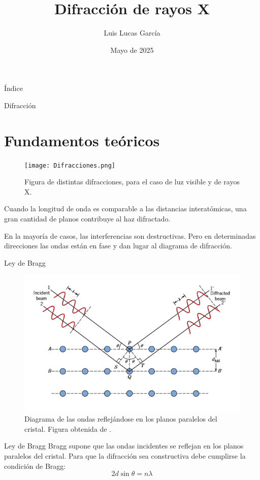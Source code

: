 \documentclass{beamer}
\title[Difracción de rayos X]{Difracción de rayos X}
\author{Luis Lucas García}
\institute[UA]{Universidad de Alicante - Facultad de Ciencias - Grado en física - Ciencia de Materiales}
\date{Mayo de 2025}
\begin{document}
\maketitle
\begin{frame}{Índice}
    \tableofcontents
\end{frame}
\begin{frame}{Difracción \cite{simon2013oxford}}
    \section{Fundamentos teóricos}
    \begin{figure}[h!]
        \begin{center}
            \texttt{[image: Difracciones.png]}
        \end{center}
        \caption{Figura de distintas difracciones, para el caso de luz visible y de rayos X.}
    \end{figure}
    Cuando la longitud de onda es comparable a las distancias interatómicas, una gran cantidad de planos contribuye al haz difractado.

    En la mayoría de casos, las interferencias son destructivas. Pero en determinadas direcciones las ondas están en fase y dan lugar al diagrama de difracción.
\end{frame}
\begin{frame}{Ley de Bragg}
    \begin{figure}[h!]
        \begin{center}
            \includegraphics[max width=0.35\linewidth]{BraggLaw.png}
        \end{center}
        \caption{Diagrama de las ondas reflejándose en los planos paralelos del cristal. Figura obtenida de \cite{braggFigure}.}
    \end{figure}
    \begin{block}{Ley de Bragg}
        Bragg supone que las ondas incidentes se reflejan en los planos paralelos del cristal. Para que la difracción sea constructiva debe cumplirse la condición de Bragg:
        \begin{equation}
            2d\sin\theta = n\lambda
            \label{eq:braggLaw}
        \end{equation}
    \end{block}
\end{frame}
\end{document}
